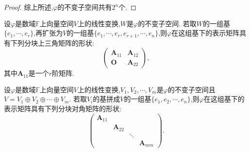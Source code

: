 \documentclass[../../main.tex]{subfiles}
\begin{document}
\begin{proof}
综上所述,\(\varphi\)的不变子空间共有\(2^n\)个. 
\end{proof}

\begin{theorem}\label{theorem:在不变子空间基下的矩阵}
设\(\varphi\)是数域\(\mathbb{F}\)上向量空间\(V\)上的线性变换,\(W\)是\(\varphi\)的不变子空间. 若取\(W\)的一组基\(\{e_1,\cdots,e_r\}\),再扩张为\(V\)的一组基\(\{e_1,\cdots,e_r,e_{r + 1},\cdots,e_n\}\),则\(\varphi\)在这组基下的表示矩阵具有下列分块上三角矩阵的形状:
\[
\begin{pmatrix}
\boldsymbol{A}_{11}&\boldsymbol{A}_{12}\\
\boldsymbol{O}&\boldsymbol{A}_{22}
\end{pmatrix},
\]
其中\(\boldsymbol{A}_{11}\)是一个\(r\)阶矩阵.
\end{theorem}

\begin{theorem}\label{theorem:在直和的基下的矩阵}
设\(\varphi\)是数域\(\mathbb{F}\)上向量空间\(V\)上的线性变换,\(V_1,V_2,\cdots,V_m\)是\(\varphi\)的不变子空间且\(V = V_1\oplus V_2\oplus\cdots\oplus V_m\). 若取\(V_i\)的基拼成\(V\)的一组基\(\{e_1,e_2,\cdots,e_n\}\),则\(\varphi\)在这组基下的表示矩阵具有下列分块对角矩阵的形状:
\[
\begin{pmatrix}
\boldsymbol{A}_{11}&&&\\
&\boldsymbol{A}_{22}&&\\
&&\ddots&\\
&&&\boldsymbol{A}_{mm}
\end{pmatrix}.
\]
\end{theorem}
\end{document}
